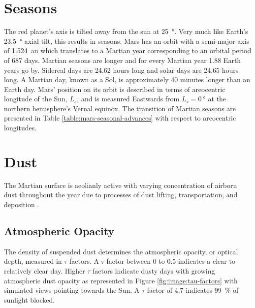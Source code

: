 %

\section{Seasons}
\label{sec:MartianEnvironment:Seasons}
The red planet's axis is tilted away from the sun at \SI{25}{\degree}. Very much like Earth's \SI{23.5}{\degree} axial tilt, this results in seasons. Mars has an orbit with a semi-major axis of \SI{1.524}{\astronomicalunit} which translates to a Martian year corresponding to an orbital period of 687 days. Martian seasons are longer and for every Martian year 1.88 Earth years go by. Sidereal days are 24.62 hours long and solar days are 24.65 hours long. A Martian day, known as a Sol, is approximately 40 minutes longer than an Earth day. Mars' position on its orbit is described in terms of areocentric longitude of the Sun, $L_{s}$, and is measured Eastwards from $L_{s} = \SI{0}{\degree}$ at the northern hemisphere's Vernal equinox. The transition of Martian seasons are presented in Table \ref{table:mars-seasonal-advances} with respect to areocentric longitudes.




\section{Dust}
\label{sec:MartianEnvironment:Dust}
The Martian surface is aeolianly active with varying concentration of airborn dust throughout the year due to processes of dust lifting, transportation, and deposition .

\subsection{Atmospheric Opacity}
\label{sec:MartianEnvironment:Dust:AtmosphericOpacity}
The density of suspended dust determines the atmospheric opacity, or optical depth, measured in $\tau$ factors. A $\tau$ factor between 0 to 0.5 indicates a clear to relatively clear day. Higher $\tau$ factors indicate dusty days with growing atmospheric dust opacity as represented in Figure \ref{fig:image:tau-factors} with simulated views pointing towards the Sun. A $\tau$ factor of 4.7 indicates \SI{99}{\percent} of sunlight blocked.


